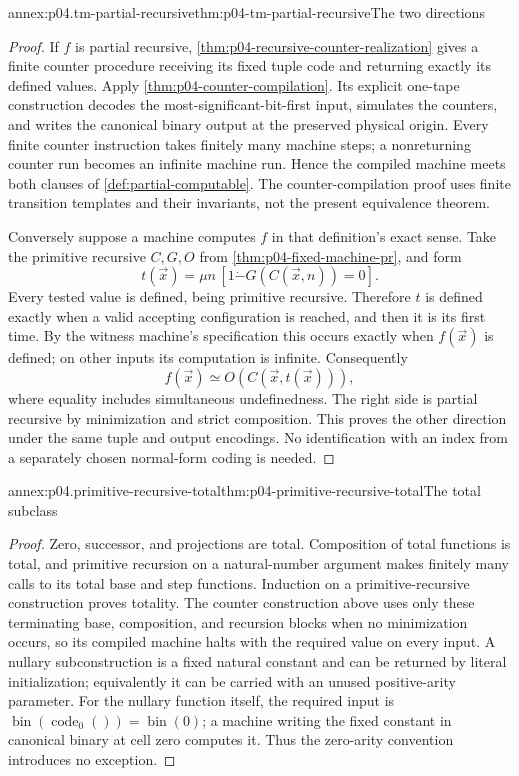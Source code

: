 \begin{annexitem}{annex:p04.tm-partial-recursive}{thm:p04-tm-partial-recursive}{The two directions}
\begin{proof}
If \(f\) is partial recursive, \cref{thm:p04-recursive-counter-realization}
gives a finite counter procedure receiving its fixed tuple code and
returning exactly its defined values. Apply
\cref{thm:p04-counter-compilation}. Its explicit one-tape construction
decodes the most-significant-bit-first input, simulates the counters,
and writes the canonical binary output at the preserved physical origin.
Every finite counter instruction takes finitely many machine steps;
a nonreturning counter run becomes an infinite machine run. Hence the
compiled machine meets both clauses of \cref{def:partial-computable}.
The counter-compilation proof uses finite transition templates and
their invariants, not the present equivalence theorem.

Conversely suppose a machine computes \(f\) in that definition's exact
sense. Take the primitive recursive \(C,G,O\) from
\cref{thm:p04-fixed-machine-pr}, and form
\[
 t(\vec x)=\mu n\,[1\mathbin{\dot{-}}G(C(\vec x,n))=0].
\]
Every tested value is defined, being primitive recursive. Therefore
\(t\) is defined exactly when a valid accepting configuration is
reached, and then it is its first time. By the witness machine's
specification this occurs exactly when \(f(\vec x)\) is defined;
on other inputs its computation is infinite. Consequently
\[
 f(\vec x)\simeq O(C(\vec x,t(\vec x))),
\]
where equality includes simultaneous undefinedness. The right side is
partial recursive by minimization and strict composition. This proves
the other direction under the same tuple and output encodings.
No identification with an index from a separately chosen normal-form
coding is needed.
\end{proof}
\end{annexitem}

\begin{annexitem}{annex:p04.primitive-recursive-total}{thm:p04-primitive-recursive-total}{The total subclass}
\begin{proof}
Zero, successor, and projections are total. Composition of total
functions is total, and primitive recursion on a natural-number argument
makes finitely many calls to its total base and step functions. Induction
on a primitive-recursive construction proves totality. The counter
construction above uses only these terminating base, composition, and
recursion blocks when no minimization occurs, so its compiled machine
halts with the required value on every input. A nullary subconstruction
is a fixed natural constant and can be returned by literal initialization;
equivalently it can be carried with an unused positive-arity parameter.
For the nullary function itself, the required input is
\(\operatorname{bin}(\operatorname{code}_0())=\operatorname{bin}(0)\);
a machine writing the fixed constant in canonical binary at cell zero
computes it. Thus the zero-arity convention introduces no exception.
\end{proof}
\end{annexitem}
